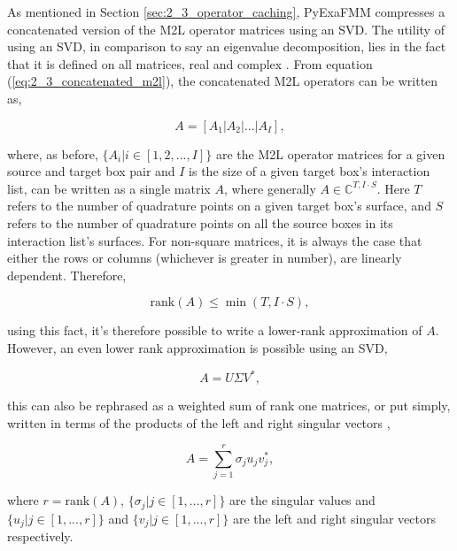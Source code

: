 As mentioned in Section \ref{sec:2_3_operator_caching}, \gls{PyExaFMM} compresses
a concatenated version of the \gls{M2L} operator matrices using an \gls{SVD}.
The utility of using an SVD, in comparison to say an eigenvalue decomposition, lies
in the fact that it is defined on all matrices, real and complex
\cite{Trefethen:1997:SIAM}. From equation (\ref{eq:2_3_concatenated_m2l}), the
concatenated M2L operators can be written as,

\begin{equation}
    A = \left [ A_1 | A_2 | ... | A_I \right],
    \label{eq:2_4_concatenated_m2l}
\end{equation}

where, as before, $\{A_i | i \in [1, 2, ..., I]\}$ are the M2L operator matrices
for a given source and target box pair and $I$ is the size of a given target box's
interaction list, can be written as a single matrix $A$, where generally
$A \in \mathbb{C}^{T, I \cdot S}$. Here $T$ refers to the number of quadrature
points on a given target box's surface, and $S$ refers to the number of quadrature
points on all the source boxes in its interaction list's surfaces. For non-square
matrices, it is always the case that either the rows or columns (whichever is
greater in number), are linearly dependent. Therefore,

\begin{equation}
    \text{rank}(A) \leq \min (T, I \cdot S),
\end{equation}

using this fact, it's therefore possible to write a lower-rank approximation of $A$.
However, an even lower rank approximation is possible using an SVD,

\begin{equation}
    A = U \Sigma V^*,
\end{equation}

this can also be rephrased as a weighted sum of rank one matrices, or put simply,
written in terms of the products of the left and right singular vectors \cite{Trefethen:1997:SIAM},

\begin{equation}
    A = \sum_{j=1}^{r}\sigma_j u_j v_j^*,
\end{equation}

where $r = \text{rank} (A)$, $\{\sigma_j | j \in [1, ..., r] \}$ are the singular
values and $\{u_j | j \in [1, ..., r] \} $ and $\{v_j | j \in [1, ..., r] \}$
are the left and right singular vectors respectively.


